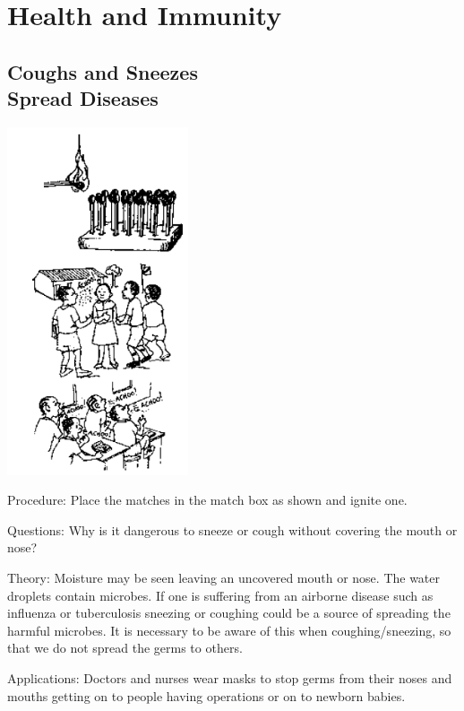 \section{Health and Immunity}

\begin{multicols}{2}


\subsection[Coughs and Sneezes Spread Diseases]{Coughs and Sneezes \hfill \\ Spread Diseases} %

\begin{center}
\includegraphics[width=0.4\textwidth]{./img/source/coughs.png}
\end{center}

\begin{description*}
\item[Procedure:]{Place the matches in the match box as shown and ignite one.}
\item[Questions:]{Why is it dangerous to sneeze or cough without covering the mouth or nose?}
\item[Theory:]{Moisture may be seen leaving an uncovered mouth or nose. The water droplets contain
microbes. If one is suffering from an airborne disease such as influenza or tuberculosis
sneezing or coughing could be a source of spreading the harmful microbes. It is necessary to
be aware of this when coughing/sneezing, so that we do not spread the germs to others.
}
\item[Applications:]{Doctors and nurses wear masks to stop germs from their noses and mouths getting on to
people having operations or on to newborn babies.}
\end{description*}


\end{multicols}
